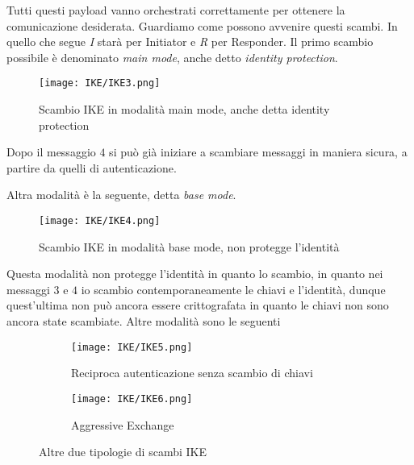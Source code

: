 \documentclass[14pt]{extreport}
\begin{document}
Tutti questi payload vanno orchestrati correttamente per ottenere la comunicazione desiderata. Guardiamo come possono avvenire questi scambi. In quello che segue \textit{I} starà per Initiator e \textit{R} per Responder.
Il primo scambio possibile è denominato \textit{main mode}, anche detto \textit{identity protection}.


\begin{figure}[H]
    \centering
    \texttt{[image: IKE/IKE3.png]}
    \caption{Scambio IKE in modalità main mode, anche detta identity protection}
    \label{ike2}
\end{figure}

Dopo il messaggio $4$ si può già iniziare a scambiare messaggi in maniera sicura, a partire da quelli di autenticazione.

Altra modalità è la seguente, detta \textit{base mode}.
\begin{figure}[H]
    \centering
    \texttt{[image: IKE/IKE4.png]}
    \caption{Scambio IKE in modalità base mode, non protegge l'identità}
    \label{ike3}
\end{figure}
Questa modalità non protegge l'identità in quanto lo scambio, in quanto nei messaggi $3$ e $4$ io scambio contemporaneamente le chiavi e l'identità, dunque quest'ultima non può ancora essere crittografata in quanto le chiavi non sono ancora state scambiate.
Altre modalità sono le seguenti





\begin{figure}[H]
     \centering
     \begin{subfigure}[b]{0.6\textwidth}
         \centering
         \texttt{[image: IKE/IKE5.png]}
         \caption{Reciproca autenticazione senza scambio di chiavi}
         
     \end{subfigure}
    
     \begin{subfigure}[b]{0.6\textwidth}
         \centering
         \texttt{[image: IKE/IKE6.png]}
         \caption{Aggressive Exchange}
         
     \end{subfigure}
     
     
     
        \caption{Altre due tipologie di scambi IKE}
        
\end{figure}
\end{document}

